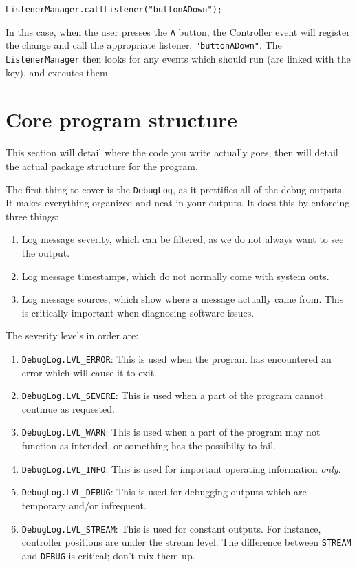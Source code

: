 \documentclass[a4paper]{article}
\begin{document}
\begin{lstlisting}
ListenerManager.callListener("buttonADown");
\end{lstlisting}

In this case, when the user presses the \lstinline{A} button, the Controller event will register the change and call the appropriate listener, \lstinline{"buttonADown"}. The \lstinline{ListenerManager} then looks for any events which should run (are linked with the key), and executes them.


\section{Core program structure}
This section will detail where the code you write actually goes, then will detail the actual package structure for the program.\newline

The first thing to cover is the \lstinline{DebugLog}, as it prettifies all of the debug outputs. It makes everything organized and neat in your outputs. It does this by enforcing three things:
\begin{enumerate}\item{Log message severity, which can be filtered, as we do not always want to see the output.}\item{Log message timestamps, which do not normally come with system outs.}\item{Log message sources, which show where a message actually came from. This is critically important when diagnosing software issues.}\end{enumerate}

The severity levels in order are:

\begin{enumerate}\item{\lstinline{DebugLog.LVL_ERROR}: This is used when the program has encountered an error which will cause it to exit.}\item{\lstinline{DebugLog.LVL_SEVERE}: This is used when a part of the program cannot continue as requested.}\item{\lstinline{DebugLog.LVL_WARN}: This is used when a part of the program may not function as intended, or something has the possibilty to fail.}\item{\lstinline{DebugLog.LVL_INFO}: This is used for important operating information \textit{only}.}\item{\lstinline{DebugLog.LVL_DEBUG}: This is used for debugging outputs which are temporary and/or infrequent.}\item{\lstinline{DebugLog.LVL_STREAM}: This is used for constant outputs. For instance, controller positions are under the stream level. The difference between \lstinline{STREAM} and \lstinline{DEBUG} is critical; don't mix them up.}\end{enumerate}
\end{document}

